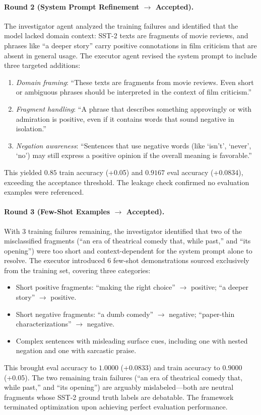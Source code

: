 \paragraph{Round 2 (System Prompt Refinement $\to$ Accepted).}
The investigator agent analyzed the training failures and identified that the model lacked domain context: SST-2 texts are fragments of movie reviews, and phrases like ``a deeper story'' carry positive connotations in film criticism that are absent in general usage. The executor agent revised the system prompt to include three targeted additions:
\begin{enumerate}
  \item \emph{Domain framing}: ``These texts are fragments from movie reviews. Even short or ambiguous phrases should be interpreted in the context of film criticism.''
  \item \emph{Fragment handling}: ``A phrase that describes something approvingly or with admiration is positive, even if it contains words that sound negative in isolation.''
  \item \emph{Negation awareness}: ``Sentences that use negative words (like `isn't', `never', `no') may still express a positive opinion if the overall meaning is favorable.''
\end{enumerate}
This yielded $0.85$ train accuracy (+0.05) and $0.9167$ eval accuracy (+0.0834), exceeding the acceptance threshold. The leakage check confirmed no evaluation examples were referenced.

\paragraph{Round 3 (Few-Shot Examples $\to$ Accepted).}
With 3 training failures remaining, the investigator identified that two of the misclassified fragments (``an era of theatrical comedy that, while past,'' and ``its opening'') were too short and context-dependent for the system prompt alone to resolve. The executor introduced 6 few-shot demonstrations sourced exclusively from the training set, covering three categories:
\begin{itemize}
  \item Short positive fragments: ``making the right choice'' $\to$ positive; ``a deeper story'' $\to$ positive.
  \item Short negative fragments: ``a dumb comedy'' $\to$ negative; ``paper-thin characterizations'' $\to$ negative.
  \item Complex sentences with misleading surface cues, including one with nested negation and one with sarcastic praise.
\end{itemize}
This brought eval accuracy to $1.0000$ (+0.0833) and train accuracy to $0.9000$ (+0.05). The two remaining train failures (``an era of theatrical comedy that, while past,'' and ``its opening'') are arguably mislabeled---both are neutral fragments whose SST-2 ground truth labels are debatable. The framework terminated optimization upon achieving perfect evaluation performance.

